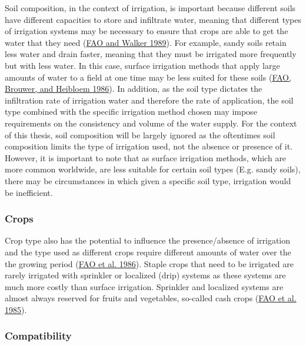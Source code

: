 \documentclass[12pt,twoside]{reedthesis}
\begin{document}
Soil composition, in the context of irrigation, is important because different soils have different capacities to store and infiltrate water, meaning that different types of irrigation systems may be necessary to ensure that crops are able to get the water that they need (\protect\hyperlink{ref-faoGuidelinesDesigningEvaluating1989}{FAO and Walker 1989}). For example, sandy soils retain less water and drain faster, meaning that they must be irrigated more frequently but with less water. In this case, surface irrigation methods that apply large amounts of water to a field at one time may be less suited for these soils (\protect\hyperlink{ref-faoIrrigationWaterManagement1986a}{FAO, Brouwer, and Heibloem 1986}). In addition, as the soil type dictates the infiltration rate of irrigation water and therefore the rate of application, the soil type combined with the specific irrigation method chosen may impose requirements on the consistency and volume of the water supply. For the context of this thesis, soil composition will be largely ignored as the oftentimes soil composition limits the type of irrigation used, not the absence or presence of it. However, it is important to note that as surface irrigation methods, which are more common worldwide, are less suitable for certain soil types (E.g. sandy soils), there may be circumstances in which given a specific soil type, irrigation would be inefficient.

\hypertarget{crops}{%
\subsubsection{Crops}\label{crops}}

Crop type also has the potential to influence the presence/absence of irrigation and the type used as different crops require different amounts of water over the the growing period (\protect\hyperlink{ref-faoIrrigationWaterManagement1986}{FAO et al. 1986}). Staple crops that need to be irrigated are rarely irrigated with sprinkler or localized (drip) systems as these systems are much more costly than surface irrigation. Sprinkler and localized systems are almost always reserved for fruits and vegetables, so-called cash crops (\protect\hyperlink{ref-faoIrrigationWaterManagement1985}{FAO et al. 1985}).

\hypertarget{combatibility}{%
\subsubsection{Compatibility}\label{combatibility}}
\end{document}

